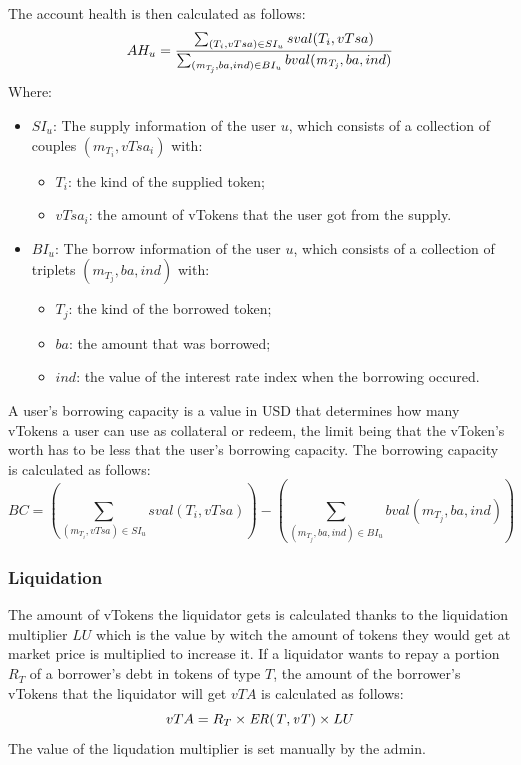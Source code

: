 The account health is then calculated as follows:
$$
  AH_u = 
    \frac { 
      \sum_{(T_i, vTsa) \in SI_u} 
        sval(T_i, vTsa)
    } { 
      \sum_{(\mathit{m_{T_j}}, ba, ind) \in BI_u} 
      bval(\mathit{m_{T_j}}, ba, ind)
    }
$$
Where: 
\begin{itemize}
  \item $SI_u$: The supply information of the user $u$, which consists of a collection of couples $(m_{T_i}, vTsa_i)$ with: 
  \begin{itemize}
    \item $T_i$: the kind of the supplied token;
    \item $vTsa_i$: the amount of vTokens that the user got from the supply. 
  \end{itemize}
  \item $BI_u$: The borrow information of the user $u$, which consists of a collection of triplets $(m_{T_j}, ba, ind)$ with: 
  \begin{itemize}
    \item $T_j$: the kind of the borrowed token;
    \item $ba$: the amount that was borrowed;
    \item $ind$: the value of the interest rate index when the borrowing occured. 
  \end{itemize}
\end{itemize}

A user's borrowing capacity is a value in USD that determines how many vTokens a user can use as collateral or redeem, the limit being that the vToken's worth has to be less that the user's borrowing capacity. The borrowing capacity is calculated as follows: 
$$
  BC = (\sum_{(m_{T_i}, vTsa) \in SI_u} sval(T_i, vTsa)) - (\sum_{(m_{T_j}, ba, ind) \in BI_u} bval(m_{T_j}, ba, ind))
$$

\subsubsection{Liquidation}

The amount of vTokens the liquidator gets is calculated thanks to the liquidation multiplier $LU$ which is the value by witch the amount of tokens they would get at market price is multiplied to increase it. If a liquidator wants to repay a portion $R_T$ of a borrower's debt in tokens of type $T$, the amount of the borrower's vTokens that the liquidator will get $vTA$ is calculated as follows:
$$
  vTA = R_T \times \mathit{ER(T, vT)} \times LU
$$
The value of the liqudation multiplier is set manually by the admin.

